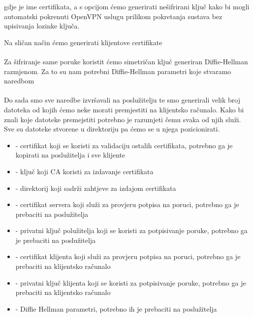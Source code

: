         \noindent
        gdje je  ime certifikata, a s  opcijom ćemo
        generirati nešifrirani ključ kako bi mogli automatski pokrenuti OpenVPN
        uslugu prilikom pokretanja sustava bez upisivanja lozinke ključa.

        Na sličan način ćemo generirati klijentove certifikate \\

        \noindent
         \\
        
        \noindent
        Za šifriranje same poruke koristit ćemo simetričan ključ generiran
        Diffie-Hellman razmjenom. Za to su nam potrebni Diffie-Hellman
        parametri koje stvaramo naredbom \\

        \noindent
         \\

        \noindent
        Do sada smo sve naredbe izvršavali na poslužitelju te smo generirali
        velik broj datoteka od kojih ćemo neke morati premjestiti na klijentsko
        računalo. Kako bi znali koje datoteke premejstiti potrebno je razumjeti
        čemu svaka od njih služi. Sve su datoteke stvorene u
        direktoriju pa ćemo se u njega pozicionirati. \\

        \begin{itemize}
        \item {} - certifikat koji se koristi za validaciju ostalih
        certifikata, potrebno ga je kopirati na poslužitelja i sve klijente
        \item {} - ključ koji CA koristi za izdavanje certifikata
        \item {} - direktorij koji sadrži zahtjeve za izdajom
        certifikata 
        \item {} - certifikat servera koji služi za
        provjeru potpisa na poruci, potrebno ga je prebaciti na poslužitelja
        \item {} - privatni ključ polužitelja
        koji se koristi za potpisivanje poruke, potrebno ga je prebaciti na
        poslužitelja
        \item {} - certifikat klijenta koji služi za
        provjeru potpisa na poruci, potrebno ga je prebaciti na klijentsko
        računalo
        \item {} - privatni ključ klijenta
        koji se koristi za potpisivanje poruke, potrebno ga je prebaciti na
        klijentsko računalo
        \item {} - Diffie Hellman parametri, potrebno ih je prebaciti na
        poslužitelja
        \end{itemize}
        \newpage


